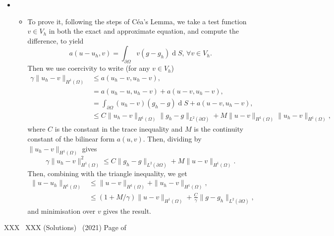 \documentclass[11pt]{article}
\newcommand{\coursenum}{XXX} %
\newcommand{\coursename}{XXX (Solutions)}
\renewcommand{\pagetotal}{\pageref{pagetot}}     %
\newcommand{\examyear}{2021}%
\DeclareMathOperator{\diff}{d}
\newcounter{count_marks}
\newcounter{count_amarks}
\newcounter{count_bmarks}
\newcounter{count_cmarks}
\newcounter{count_dmarks}
\newcounter{count_mmarks} %
\newcommand{\dmarks}[1]{\addtocounter{count_marks}{#1} \addtocounter{count_dmarks}{#1}\marginpar{~~\fbox{\,\mathstrut #1, D}}}
\newenvironment{Question}[1] 
 {\begin{itemize} \item[\large #1.~~]}{\end{itemize}\vfill
}
\newenvironment{Part}[1] 
 {\begin{itemize} \item[(#1)~~]}{\end{itemize}}
\newcommand{\EndPage}{\vfill \coursenum ~ \coursename ~
 (\examyear) \hfill Page \thepage\/ of \pagetotal \newpage}
\begin{document}
\begin{Question}{3}
\begin{Part}{c}
  
  To prove it, following the steps of C\'ea's Lemma, we take a test
  function $v\in V_h$ in both the exact and approximate equation, and
  compute the difference, to yield
  \begin{equation}
    a(u-u_h,v) = \int_{\partial \Omega} v(g-g_h) \diff S, \,
    \forall v \in V_h.
  \end{equation}
  Then we use coercivity to write (for any $v\in V_h$)
  \begin{align}
    \gamma\|u_h-v\|_{H^1(\Omega)} &\leq
    a(u_h-v,u_h-v), \\
    &= a(u_h-u,u_h-v) + a(u-v,u_h-v), \\
    &= \int_{\partial\Omega}(u_h-v)(g_h-g)\diff S
    + a(u-v,u_h-v), \\
    &\leq C\|u_h-v\|_{H^1(\Omega)}\|g_h-g\|_{L^2(\partial\Omega)}
    + M\|u-v\|_{H^1(\Omega)}\|u_h-v\|_{H^1(\Omega)},
  \end{align}
  where $C$ is the constant in the trace inequality and $M$
  is the continuity constant of the bilinear form $a(u,v)$.
  Then, dividing by $\|u_h-v\|_{H^1(\Omega)}$ gives
  \begin{equation}
    \gamma\|u_h-v\|_{H^1(\Omega)}^2 \leq C\|g_h-g\|_{L^2(\partial\Omega)}
    + M\|u-v\|_{H^1(\Omega)}.
  \end{equation}
  Then, combining with the triangle inequality, we get
  \begin{align}
    \|u-u_h\|_{H^1(\Omega)} &\leq \|u-v\|_{H^1(\Omega)} +
    \|u_h-v\|_{H^1(\Omega)}, \\ &\leq
    (1+M/\gamma)\|u-v\|_{H^1(\Omega)} +
    \frac{C}{\gamma}\|g-g_h\|_{L^2(\partial\Omega)},
  \end{align}
  and minimisation over $v$ gives the result.
 \dmarks{8}
\end{Part}

\end{Question}
\EndPage
\end{document}
